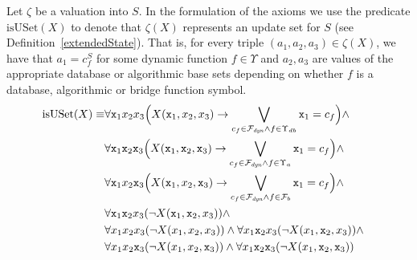 \documentclass[preprint,11pt]{elsarticle}
\theoremstyle{definition}
\theoremstyle{remark}
\begin{document}
Let $\zeta$ be a valuation into $S$. In the formulation of the axioms we use the predicate $\mathrm{isUSet}(X)$ to denote that $\zeta(X)$ represents an update set for $S$ (see Definition~\ref{extendedState}).  That is, for every triple $(a_1, a_2, a_3) \in \zeta(X)$, we have that $a_1 = c^S_f$ for some dynamic function $f \in \Upsilon$ and $a_2, a_3$ are values of the appropriate database or algorithmic base sets depending on whether $f$ is a database, algorithmic or bridge function symbol. 
\begin{align*}
\mathrm{isUSet}(X) \equiv& \forall \mathtt{x}_1 x_2 x_3 \Big(X(\mathtt{x}_1, x_2, x_3) \rightarrow \bigvee_{c_f \in {\cal F}_\mathit{dyn} \wedge f \in \Upsilon_{db}} \mathtt{x}_1 = c_f\Big) \wedge&\\
&\forall \mathtt{x}_1 \mathtt{x}_2 \mathtt{x}_3 \Big(X(\mathtt{x}_1, \mathtt{x}_2, \mathtt{x}_3) \rightarrow \bigvee_{c_f \in {\cal F}_\mathit{dyn} \wedge f \in \Upsilon_{a}} \mathtt{x}_1 = c_f\Big) \wedge&\\
&\forall \mathtt{x}_1 x_2 \mathtt{x}_3 \Big(X(\mathtt{x}_1, x_2, \mathtt{x}_3) \rightarrow \bigvee_{c_f \in {\cal F}_\mathit{dyn} \wedge f \in {\cal F}_{b}} \mathtt{x}_1 = c_f\Big) \wedge&\\
&\forall \mathtt{x}_1 \mathtt{x}_2 x_3( \neg X(\mathtt{x}_1, \mathtt{x}_2, x_3)) \wedge&\\
&\forall x_1 x_2 x_3( \neg X(x_1, x_2, x_3)) \wedge \forall x_1 \mathtt{x}_2 x_3( \neg X(x_1, \mathtt{x}_2, x_3)) \wedge&\\
&\forall x_1 x_2 \mathtt{x}_3( \neg X(x_1, x_2, \mathtt{x}_3)) \wedge \forall x_1 \mathtt{x}_2 \mathtt{x}_3( \neg X(x_1, \mathtt{x}_2, \mathtt{x}_3))&
\end{align*}

 
\end{document}
